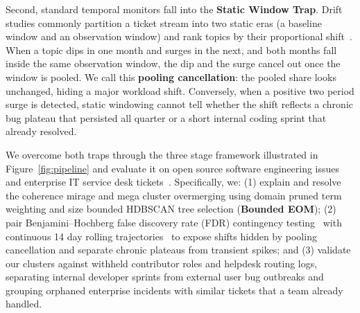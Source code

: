 \documentclass[sigconf,nonacm,pbalance]{acmart}
\begin{document}
Second, standard temporal monitors fall into the \textbf{Static Window Trap}. Drift studies commonly partition a ticket stream into two static eras (a baseline window and an observation window) and rank topics by their proportional shift~\cite{chen2020incidental, dieng2020dynamic, grootendorst2022bertopic}. When a topic dips in one month and surges in the next, and both months fall inside the same observation window, the dip and the surge cancel out once the window is pooled. We call this \textbf{pooling cancellation}: the pooled share looks unchanged, hiding a major workload shift. Conversely, when a positive two period surge is detected, static windowing cannot tell whether the shift reflects a chronic bug plateau that persisted all quarter or a short internal coding sprint that already resolved.

We overcome both traps through the three stage framework illustrated in Figure~\ref{fig:pipeline} and evaluate it on open source software engineering issues~\cite{lhoest2021datasets} and enterprise IT service desk tickets~\cite{vogel2024itsm}. Specifically, we: (1) explain and resolve the coherence mirage and mega cluster overmerging using domain pruned term weighting and size bounded HDBSCAN tree selection (\textbf{Bounded EOM}); (2) pair Benjamini--Hochberg false discovery rate (FDR) contingency testing~\cite{fisher1922interpretation, benjamini1995controlling} with continuous 14 day rolling trajectories~\cite{mann1945nonparametric, kendall1948rank} to expose shifts hidden by pooling cancellation and separate chronic plateaus from transient spikes; and (3) validate our clusters against withheld contributor roles and helpdesk routing logs, separating internal developer sprints from external user bug outbreaks and grouping orphaned enterprise incidents with similar tickets that a team already handled.
\end{document}

